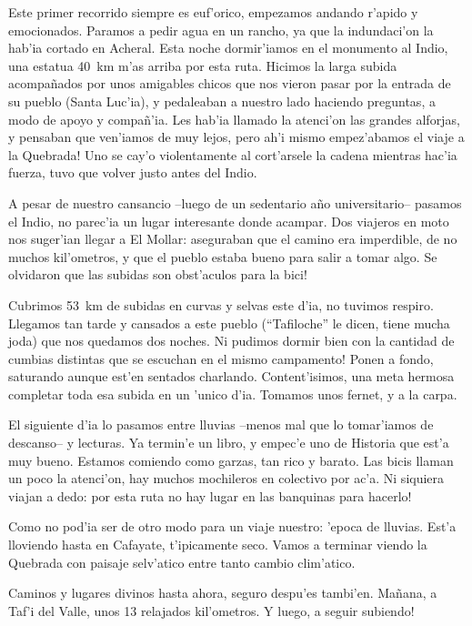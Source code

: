 Este primer recorrido siempre es euf'orico, empezamos andando r'apido y
emocionados. Paramos a pedir agua en un rancho, ya que la indundaci'on la
hab'ia cortado en Acheral. Esta noche dormir'iamos en el monumento al Indio, una
estatua 40~km m'as arriba por esta ruta. Hicimos la larga subida acompa\~nados
por unos amigables chicos que nos vieron pasar por la entrada de su pueblo
(Santa Luc'ia), y pedaleaban a nuestro lado haciendo preguntas, a modo de apoyo
y compa\~n'ia. Les hab'ia llamado la atenci'on las grandes alforjas, y pensaban
que ven'iamos de muy lejos, \textexclamdown pero ah'i mismo empez'abamos el
viaje a la Quebrada! Uno se cay'o violentamente al cort'arsele la cadena
mientras hac'ia fuerza, tuvo que volver justo antes del Indio.

A pesar de nuestro cansancio --luego de un sedentario a\~no universitario--
pasamos el Indio, no parec'ia un lugar interesante donde acampar. Dos viajeros
en moto nos suger'ian llegar a El Mollar: aseguraban que el camino era
imperdible, de no muchos kil'ometros, y que el pueblo estaba bueno para salir a
tomar algo. \textexclamdown Se olvidaron que las subidas son obst'aculos para la
bici!

Cubrimos 53~km de subidas en curvas y selvas este d'ia, no tuvimos respiro.
Llegamos tan tarde y cansados a este pueblo (``Tafiloche'' le dicen,
tiene mucha joda) que nos quedamos dos noches. \textexclamdown Ni pudimos dormir
bien con la cantidad de cumbias distintas que se escuchan en el mismo
campamento! Ponen a fondo, saturando aunque est'en sentados charlando.
Content'isimos, una meta hermosa completar toda esa subida en un 'unico d'ia.
Tomamos unos fernet, y a la carpa.

El siguiente d'ia lo pasamos entre lluvias --menos mal que lo tomar'iamos de
descanso-- y lecturas. Ya termin'e un libro, y empec'e uno de Historia que est'a
muy bueno. Estamos comiendo como garzas, tan rico y barato. Las bicis llaman un
poco la atenci'on, hay muchos mochileros en colectivo por ac'a. Ni siquiera
viajan a dedo: \textexclamdown por esta ruta no hay lugar en las banquinas para
hacerlo!

Como no pod'ia ser de otro modo para un viaje nuestro: 'epoca de lluvias. Est'a
lloviendo hasta en Cafayate, t'ipicamente seco. Vamos a terminar viendo la
Quebrada con paisaje selv'atico entre tanto cambio clim'atico.

Caminos y lugares divinos hasta ahora, seguro despu'es tambi'en. Ma\~nana, a
Taf'i del Valle, unos 13 relajados kil'ometros. \textexclamdown Y luego, a
seguir subiendo!

